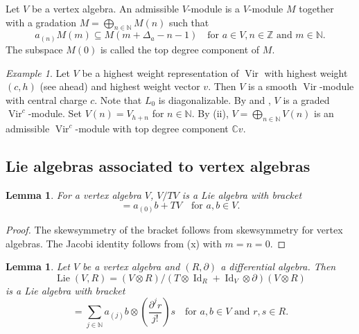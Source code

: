 \documentclass[a4paper, 12pt, reqno]{amsart}
\newtheorem{lemma}[theorem]{Lemma}
\theoremstyle{remark}
\newtheorem{example}[theorem]{Example}
\numberwithin{equation}{subsection}
\DeclareMathOperator{\Vir}{Vir}
\DeclareMathOperator{\Id}{Id}
\DeclareMathOperator{\Lie}{Lie}
\begin{document}
Let $V$ be a vertex algebra.
An admissible $V$-module is a $V$-module $M$ together with a gradation $M = \bigoplus_{n \in \mathbb{N}}M(n)$ such that
\begin{equation*}
  a_{(n)}M(m) \subseteq M(m + \Delta_a - n - 1) \quad \text{for }a \in V, n \in \mathbb{Z}\text{ and }m \in \mathbb{N}.
\end{equation*}
The subspace $M(0)$ is called the top degree component of $M$.

\begin{example}
  \label{exa:11}
  Let $V$ be a highest weight representation of $\Vir$ with highest weight $(c, h)$ (see  ahead) and highest weight vector $v$.
  Then $V$ is a smooth $\Vir$-module with central charge $c$.
  Note that $L_0$ is diagonalizable.
  By  and , $V$ is a graded $\Vir^c$-module.
  Set $V(n) = V_{h + n}$ for $n \in \mathbb{N}$.
  By (ii), $V = \bigoplus_{n \in \mathbb{N}}V(n)$ is an admissible $\Vir^c$-module with top degree component $\mathbb{C}v$.
\end{example}

\subsection{Lie algebras associated to vertex algebras}
\label{sec:lie-algebr-assoc}

\begin{lemma}
  \label{lmm:12}
  For a vertex algebra $V$, $V/TV$ is a Lie algebra with bracket
  \begin{equation*}
    [a + TV, b + TV] = a_{(0)}b + TV \quad \text{for }a, b \in V.
  \end{equation*}
\end{lemma}

\begin{proof}
  The skewsymmetry of the bracket follows from skewsymmetry for vertex algebras.
  The Jacobi identity follows from (x) with $m = n = 0$.
\end{proof}

\begin{lemma}
  \label{lmm:13}
  Let $V$ be a vertex algebra and $(R, \partial)$ a differential algebra.
  Then
  \begin{equation*}
    \Lie(V, R) = (V \otimes R)/(T\otimes\Id_R + \Id_V\otimes\partial)(V \otimes R)
  \end{equation*}
  is a Lie algebra with bracket
  \begin{equation*}
    [a\otimes r, b\otimes s] = \sum_{j \in \mathbb{N}}a_{(j)}b\otimes\left(\frac{\partial^jr}{j!}\right)s \quad \text{for }a, b \in V\text{ and }r, s \in R.
  \end{equation*}
\end{lemma}
\end{document}
